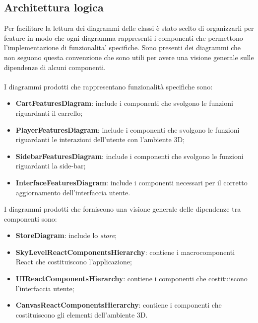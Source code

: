 \subsection{Architettura logica}
Per facilitare la lettura dei diagrammi delle classi è stato scelto di organizzarli per feature in modo che ogni diagramma 
rappresenti i componenti che permettono l'implementazione di funzionalita' specifiche.
Sono presenti dei diagrammi che non seguono questa convenzione che sono utili per avere una visione generale sulle dipendenze
di alcuni componenti.
\\\\
I diagrammi prodotti che rappresentano funzionalità specifiche sono:
\begin{itemize}
	\item \textbf{CartFeaturesDiagram}: include i componenti che svolgono le funzioni riguardanti il carrello;
	\item \textbf{PlayerFeaturesDiagram}: include i componenti che svolgono le funzioni riguardanti le interazioni dell'utente con 
	l'ambiente 3D;
	\item \textbf{SidebarFeaturesDiagram}: include i componenti che svolgono le funzioni riguardanti la side-bar;
	\item \textbf{InterfaceFeaturesDiagram}: include i componenti necessari per il corretto aggiornamento dell'interfaccia utente.
\end{itemize}
I diagrammi prodotti che forniscono una visione generale delle dipendenze tra componenti sono:
\begin{itemize}
	\item \textbf{StoreDiagram}: include lo \textit{store};
	\item \textbf{SkyLevelReactComponentsHierarchy}: contiene i macrocomponenti React che costituiscono l'applicazione;
	\item \textbf{UIReactComponentsHierarchy}: contiene i componenti che costituiscono l'interfaccia utente;
	\item \textbf{CanvasReactComponentsHierarchy}: contiene i componenti che costituiscono gli elementi dell'ambiente 3D.
\end{itemize}

